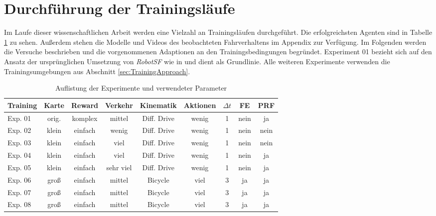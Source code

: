 
\section{Durchführung der Trainingsläufe}

Im Laufe dieser wissenschaftlichen Arbeit werden eine Vielzahl an Trainingsläufen
durchgeführt. Die erfolgreichsten Agenten sind in Tabelle \ref{tab:TrainingRuns} zu sehen.
Außerdem stehen die Modelle und Videos des beobachteten Fahrverhaltens im Appendix zur
Verfügung. Im Folgenden werden die Versuche beschrieben und die vorgenommenen Adaptionen
an den Trainingsbedingungen begründet. Experiment 01 bezieht sich auf den Ansatz
der ursprünglichen Umsetzung von \emph{RobotSF} wie in \cite{machines11020268} und
dient als Grundlinie. Alle weiteren Experimente verwenden die Trainingsumgebungen
aus Abschnitt \ref{sec:TrainingApproach}.\\

\begin{table}[h]
  \centering
\begin{tabular}{ |p{1.5cm}||c|c|c|c|c|c|c|c| }
 \hline
 Training & Karte & Reward & Verkehr & Kinematik & Aktionen & $\Delta t$ & FE & PRF \\
 \hline \hline
 Exp. 01 & orig. & komplex & mittel    & Diff. Drive & wenig & 1 & nein & ja   \\ \hline
 Exp. 02 & klein & einfach & wenig     & Diff. Drive & wenig & 1 & nein & nein \\ \hline
 Exp. 03 & klein & einfach & viel      & Diff. Drive & wenig & 1 & nein & nein \\ \hline
 Exp. 04 & klein & einfach & viel      & Diff. Drive & wenig & 1 & nein & ja   \\ \hline
 Exp. 05 & klein & einfach & sehr viel & Diff. Drive & wenig & 1 & nein & ja   \\ \hline
 Exp. 06 & groß  & einfach & mittel    & Bicycle     & viel  & 3 & ja   & ja   \\ \hline
 Exp. 07 & groß  & einfach & mittel    & Bicycle     & viel  & 3 & ja   & ja   \\ \hline
 Exp. 08 & groß  & einfach & mittel    & Bicycle     & viel  & 3 & ja   & ja   \\
 \hline
\end{tabular}
\caption{Auflistung der Experimente und verwendeter Parameter}
\label{tab:TrainingRuns}
\end{table}

